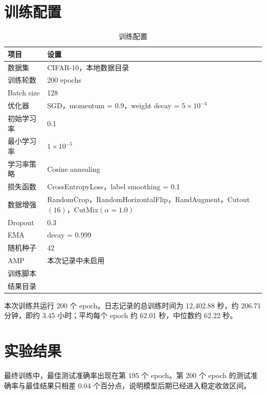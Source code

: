 \documentclass[UTF8]{ctexart}
\begin{document}
\section{训练配置}

\begin{table}[H]
    \centering
    \caption{训练配置}
    \begin{tabularx}{\textwidth}{lY}
        \toprule
        项目 & 设置 \\
        \midrule
        数据集 & CIFAR-10，本地数据目录  \\
        训练轮数 & 200 epochs \\
        Batch size & 128 \\
        优化器 & SGD，momentum = 0.9，weight decay = $5\times10^{-4}$ \\
        初始学习率 & 0.1 \\
        最小学习率 & $1\times10^{-5}$ \\
        学习率策略 & Cosine annealing \\
        损失函数 & CrossEntropyLoss，label smoothing = 0.1 \\
        数据增强 & RandomCrop，RandomHorizontalFlip，RandAugment，Cutout$(16)$，CutMix$(\alpha=1.0)$ \\
        Dropout & 0.3 \\
        EMA & decay = 0.999 \\
        随机种子 & 42 \\
        AMP & 本次记录中未启用 \\
        训练脚本 &  \\
        结果目录 &  \\
        \bottomrule
    \end{tabularx}
\end{table}

本次训练共运行 200 个 epoch。日志记录的总训练时间为 12,402.88 秒，约 206.71 分钟，即约 3.45 小时；平均每个 epoch 约 62.01 秒，中位数约 62.22 秒。

\section{实验结果}

最终训练中，最佳测试准确率出现在第 195 个 epoch。第 200 个 epoch 的测试准确率与最佳结果只相差 0.04 个百分点，说明模型后期已经进入稳定收敛区间。
\end{document}
